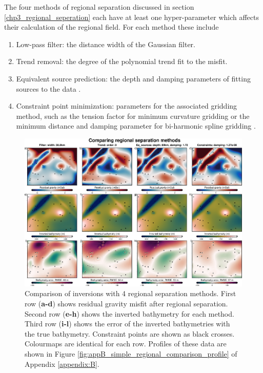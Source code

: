 The four methods of regional separation discussed in section \ref{chp3_regional_seperation} each have at least one hyper-parameter which affects their calculation of the regional field. For each method these include 
\begin{enumerate}
    \item Low-pass filter: the distance width of the Gaussian filter.
    \item Trend removal: the degree of the polynomial trend fit to the misfit.
    \item Equivalent source prediction: the depth and damping parameters of fitting sources to the data \citep{solergradientboosted2021}.
    \item Constraint point minimization: parameters for the associated gridding method, such as the tension factor for minimum curvature gridding \citep{smithgridding1990} or the minimum distance and damping parameter for bi-harmonic spline gridding \citep{uiedaverde2018}.
\end{enumerate}

\begin{figure}[!ht]
    \centering
    \includegraphics[width=1\textwidth]{figures/chp3/chp3_simple_regional_comparison.png}
    \caption[Regional separation methods]{Comparison of inversions with 4 regional separation methods. First row (\textbf{a-d}) shows residual gravity misfit after regional separation. Second row (\textbf{e-h}) shows the inverted bathymetry for each method. Third row (\textbf{i-l}) shows the error of the inverted bathymetries with the true bathymetry. Constraint points are shown as black crosses. Colourmaps are identical for each row. Profiles of these data are shown in Figure \ref{fig:appB_simple_regional_comparison_profile} of Appendix \ref{appendix:B}.}
    \label{fig:chp3_simple_regional_comparison}
\end{figure}

